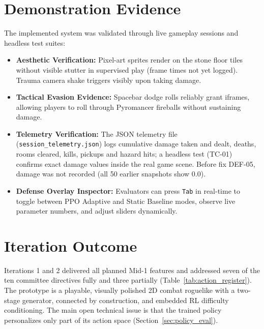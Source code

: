 \section{Demonstration Evidence}
The implemented system was validated through live gameplay sessions and headless test suites:
\begin{itemize}
    \item \textbf{Aesthetic Verification:} Pixel-art sprites render on the stone floor tiles without visible stutter in supervised play (frame times not yet logged). Trauma camera shake triggers visibly upon taking damage.
    \item \textbf{Tactical Evasion Evidence:} Spacebar dodge rolls reliably grant iframes, allowing players to roll through Pyromancer fireballs without sustaining damage.
    \item \textbf{Telemetry Verification:} The JSON telemetry file (\texttt{session\_telemetry.json}) logs cumulative damage taken and dealt, deaths, rooms cleared, kills, pickups and hazard hits; a headless test (TC-01) confirms exact damage values inside the real game scene. Before fix DEF-05, damage was not recorded (all 50 earlier snapshots show 0.0).
    \item \textbf{Defense Overlay Inspector:} Evaluators can press \texttt{Tab} in real-time to toggle between PPO Adaptive and Static Baseline modes, observe live parameter numbers, and adjust sliders dynamically.
\end{itemize}

\section{Iteration Outcome}
Iterations 1 and 2 delivered all planned Mid-1 features and addressed seven of the ten committee directives fully and three partially (Table~\ref{tab:action_register}). The prototype is a playable, visually polished 2D combat roguelike with a two-stage generator, connected by construction, and embedded RL difficulty conditioning. The main open technical issue is that the trained policy personalizes only part of its action space (Section~\ref{sec:policy_eval}).
